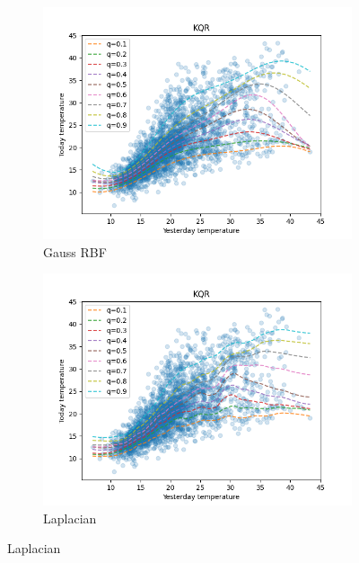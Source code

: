 \begin{figure}[!h]
    \begin{subfigure}[b]{0.5\linewidth}
        \centering
        \includegraphics[width=1.1\textwidth]{images/melborune_gaussian_rbf_kernel_quantile_regression.png} 
        \caption{Gauss RBF} 
        \label{} 
        \vspace{4ex}
    \end{subfigure}%
    \begin{subfigure}[b]{0.5\linewidth}
        \centering
        \includegraphics[width=1.1\textwidth]{images/melborune_laplacian_kernel_quantile_regression.png} 
        \caption{Laplacian} 
        \label{} 
        \vspace{4ex}

\end{subfigure}
\end{figure}
